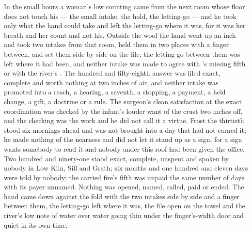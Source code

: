 In the small hours a woman's low counting came from the next room whose floor does not touch his --- the small intake, the hold, the letting-go --- and he took only what the hand could take and left the letting-go where it was, for it was her breath and her count and not his. Outside the wool the hand went up an inch and took two intakes from that room, held them in two places with a finger between, and set them side by side on the file; the letting-go between them was left where it had been, and neither intake was made to agree with 's missing fifth or with the river's . The hundred and fifty-eighth answer was filed exact, complete and worth nothing at two inches of air, and neither intake was promoted into a reach, a hearing, a seventh, a stopping, a payment, a held change, a gift, a doctrine or a rule. The surgeon's clean satisfaction at the exact coordination was checked by the infant's louder want of the crust two inches off, and the checking was the work and he did not call it a virtue. Frost the thirtieth stood six mornings ahead and was not brought into a day that had not earned it; he made nothing of the nearness and did not let it stand up as a sign, for a sign wants somebody to read it and nobody under this roof had been given the office. Two hundred and ninety-one stood exact, complete, unspent and spoken by nobody in Low Kiln, Sill and Grath; six months and one hundred and eleven days were told by nobody; the carried fire's fifth was unpaid the same number of days with its payer unnamed. Nothing was opened, named, called, paid or ended. The hand came down against the fold with the two intakes side by side and a finger between them, the letting-go left where it was, the file open on the towel and the river's low note of water over water going thin under the finger's-width door and quiet in its own time.

